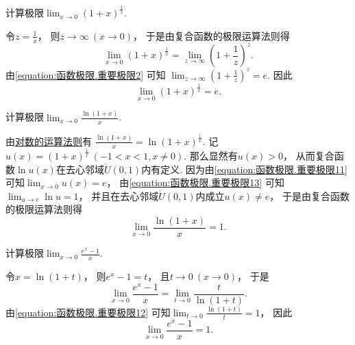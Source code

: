 \begin{example}
计算极限\(\lim_{x\to0} (1+x)^{\frac1x}\).
\begin{solution}
令\(z = \frac1x\)，
则\(z\to\infty\ (x\to0)\)，
于是由复合函数的极限运算法则得\begin{equation*}
	\lim_{x\to0} (1+x)^{\frac1x}
	= \lim_{z\to\infty} \left(1+\frac1z\right)^z.
\end{equation*}
由\cref{equation:函数极限.重要极限2} 可知
\(\lim_{z\to\infty} \left(1+\frac1z\right)^z = e\).
因此\begin{equation}\label{equation:函数极限.重要极限11}
	\lim_{x\to0} (1+x)^{\frac1x} = e.
\end{equation}
\end{solution}
\end{example}

\begin{example}
计算极限\(\lim_{x\to0} \frac{\ln(1+x)}{x}\).
\begin{solution}
由\hyperref[equation:函数.对数的基本运算法则3]{对数的运算法则}有
\(\frac{\ln(1+x)}{x} = \ln(1+x)^{\frac1x}\).
记\(u(x) = (1+x)^{\frac1x}\ (-1<x<1,x\neq0)\).
那么显然有\(u(x)>0\)，
从而复合函数\(\ln u(x)\)在去心邻域\(\mathring{U}(0,1)\)内有定义.
因为由\cref{equation:函数极限.重要极限11} 可知\(\lim_{x\to0} u(x) = e\)，
由\cref{equation:函数极限.重要极限13} 可知\(\lim_{u\to e} \ln u = 1\)，
并且在去心邻域\(\mathring{U}(0,1)\)内成立\(u(x)\neq e\)，
于是由复合函数的极限运算法则得\begin{equation}\label{equation:函数极限.重要极限12}
	\lim_{x\to0} \frac{\ln(1+x)}{x} = 1.
\end{equation}
\end{solution}
\end{example}

\begin{example}
计算极限\(\lim_{x\to0} \frac{e^x-1}{x}\).
\begin{solution}
令\(x=\ln(1+t)\)，
则\(e^x-1=t\)，
且\(t\to0\ (x\to0)\)，
于是\begin{equation*}
	\lim_{x\to0} \frac{e^x-1}{x}
	= \lim_{t\to0} \frac{t}{\ln(1+t)}.
\end{equation*}
由\cref{equation:函数极限.重要极限12} 可知\(\lim_{t\to0} \frac{\ln(1+t)}{t} = 1\)，
因此\begin{equation}\label{equation:函数极限.重要极限14}
	\lim_{x\to0} \frac{e^x-1}{x} = 1.
\end{equation}
\end{solution}
\end{example}

